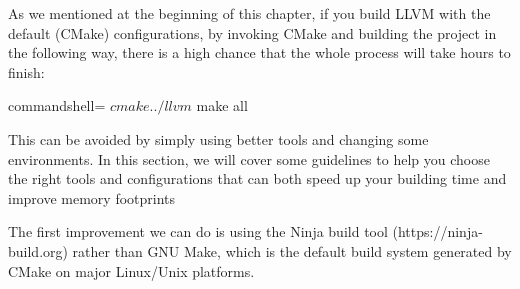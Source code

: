 As we mentioned at the beginning of this chapter, if you build LLVM with the default (CMake) configurations, by invoking CMake and building the project in the following way, there is a high chance that the whole process will take hours to finish:

\begin{tcblisting}{commandshell={}}
$ cmake ../llvm
$ make all
\end{tcblisting}

This can be avoided by simply using better tools and changing some environments. In this section, we will cover some guidelines to help you choose the right tools and configurations that can both speed up your building time and improve memory footprints


The first improvement we can do is using the Ninja build tool (https://ninja-build.org) rather than GNU Make, which is the default build system generated by CMake on major Linux/Unix platforms.





























